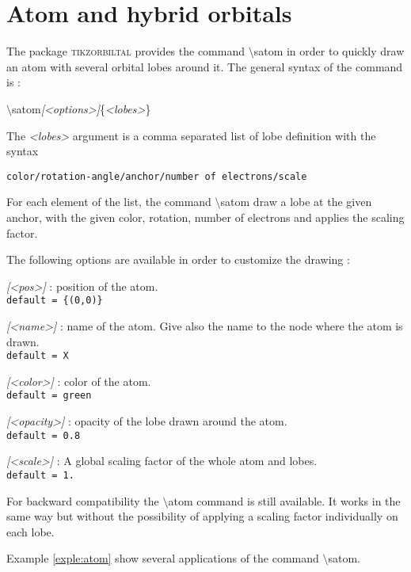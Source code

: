 \documentclass[10pt]{article}
\newcommand*{\cmd}[1]{{\ttfamily\color{blue!50!black}$\setminus$#1}\xspace}
\newcommand*{\opt}[1]{{\ttfamily\itshape\color{green!60!black}[<#1>]}\xspace}
\newcommand*{\marg}[1]{{\ttfamily\itshape\color{red!95!black}<#1>}\xspace}
\newcommand{\package}{\textsc{\sffamily\color{blue!50!black}tikzorbiltal}\xspace}
\begin{document}
\clearpage
\section{Atom and hybrid orbitals}

The package \package provides the command \cmd{satom} in order to quickly draw an atom with several orbital lobes around it. The general syntax of the command is :

\cmd{satom}\opt{options}\{\marg{lobes}\}

The \marg{lobes} argument is a comma separated list of lobe definition with the syntax 

\texttt{color/rotation-angle/anchor/number of electrons/scale}

For each element of the list, the command \cmd{satom} draw a lobe at the given
anchor, with the given color, rotation, number of electrons and applies the
scaling factor.

The following options are available in order to customize the drawing :

\begin{description}
    \item \opt{pos} : position of the atom.\\
    \texttt{default = \{(0,0)\}}
    
    \item \opt{name} : name of the atom. Give also the name to the node where the atom is drawn.\\
    \texttt{default = X}
    
    \item \opt{color} : color of the atom.\\
    \texttt{default = green}
    
    \item \opt{opacity} : opacity of the lobe drawn around the atom.\\
    \texttt{default = 0.8}
    
    \item \opt{scale} : A global scaling factor of the whole atom and lobes.\\
    \texttt{default = 1.}
\end{description}

For backward compatibility the \cmd{atom} command is still available. It works
in the same way but without the possibility of applying a scaling factor
individually on each lobe.

Example \ref{exple:atom} show several applications of the command \cmd{satom}.
\end{document}
